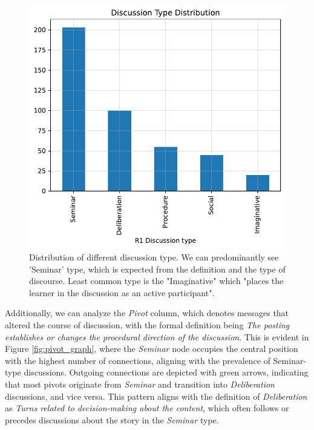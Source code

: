 \documentclass[fleqn,moreauthors,10pt]{ds_report}
\begin{document}
\begin{figure}[ht!]\centering
	\includegraphics[width=\linewidth]{fig/discussion_type_distribution.pdf}
	\caption{Distribution of different discussion type. We can predominantly see 'Seminar' type, which is expected from the definition and the type of discourse. Least common type is the "Imaginative" which "places the learner in the discussion as an active participant".  }
	\label{fig:distr}
\end{figure}

Additionally, we can analyze the \textit{Pivot} column, which denotes messages that altered the course of discussion, with the formal definition being \textit{The posting establishes or changes the procedural direction of the discussion}. This is evident in Figure \ref{fig:pivot_graph}, where the \textit{Seminar} node occupies the central position with the highest number of connections, aligning with the prevalence of Seminar-type discussions. Outgoing connections are depicted with green arrows, indicating that most pivots originate from \textit{Seminar} and transition into \textit{Deliberation} discussions, and vice versa. This pattern aligns with the definition of \textit{Deliberation} as \textit{Turns related to decision-making about the content}, which often follows or precedes discussions about the story in the \textit{Seminar} type.
 
\end{document}
